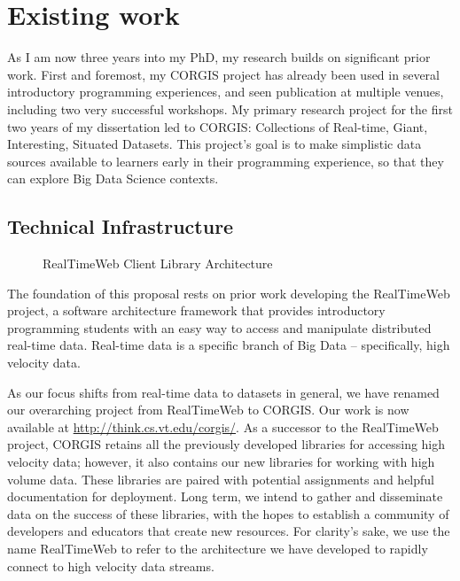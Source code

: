 \section{Existing work}

As I am now three years into my PhD, my research builds on significant prior work. First and foremost, my CORGIS project has already been used in several introductory programming experiences, and seen publication at multiple venues, including two very successful workshops.
My primary research project for the first two years of my dissertation led to CORGIS: Collections of Real-time, Giant, Interesting, Situated Datasets.
This project's goal is to make simplistic data sources available to learners early in their programming experience, so that they can explore Big Data Science contexts.

\subsection{Technical Infrastructure}

\begin{wrapfigure}{R}{0.5\textwidth}
    \begin{center}
    \end{center}
    \vspace{-\bigskipamount}
    \caption{RealTimeWeb Client Library Architecture}
    \label{fig-cla}
\end{wrapfigure}

The foundation of this proposal rests on prior work developing the RealTimeWeb project, a software architecture framework that provides introductory programming students with an easy way to access and manipulate distributed real-time data\cite{bart-transforming}.
Real-time data is a specific branch of Big Data -- specifically, high velocity data.

As our focus shifts from real-time data to datasets in general, we have renamed our overarching project from RealTimeWeb to CORGIS. Our work is now available at \url{http://think.cs.vt.edu/corgis/}. As a successor to the RealTimeWeb project, CORGIS retains all the previously developed libraries for accessing high velocity data; however, it also contains our new libraries for working with high volume data.
These libraries are paired with potential assignments and helpful documentation for deployment.
Long term, we intend to gather and disseminate data on the success of these libraries, with the hopes to establish a community of developers and educators that create new resources.
For clarity's sake, we use the name RealTimeWeb to refer to the architecture we have developed to rapidly connect to high velocity data streams.

